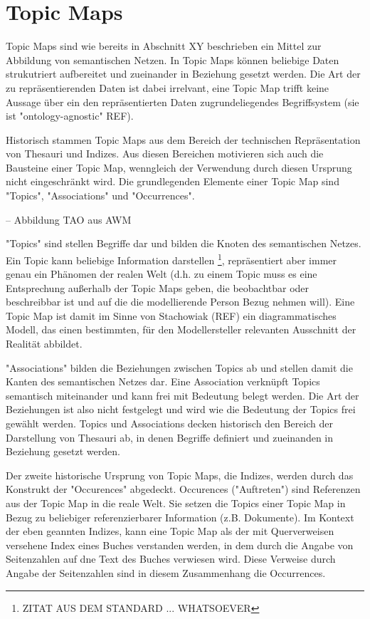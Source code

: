
\section{Topic Maps} %
\label{sec:topic_maps}

Topic Maps sind wie bereits in Abschnitt XY beschrieben ein Mittel zur Abbildung von semantischen Netzen. In Topic Maps können beliebige Daten strukutriert aufbereitet und zueinander in Beziehung gesetzt werden. Die Art der zu repräsentierenden Daten ist dabei irrelvant, eine Topic Map trifft keine Aussage über ein den repräsentierten Daten zugrundeliegendes Begriffsystem (sie ist "ontology-agnostic" REF).

Historisch stammen Topic Maps aus dem Bereich der technischen Repräsentation von Thesauri und Indizes. Aus diesen Bereichen motivieren sich auch die Bausteine einer Topic Map, wenngleich der Verwendung durch diesen Ursprung nicht eingeschränkt wird. Die grundlegenden Elemente einer Topic Map sind "Topics", "Associations" und "Occurrences". 

-- Abbildung TAO aus AWM

 "Topics" sind stellen Begriffe dar und bilden die Knoten des semantischen Netzes. Ein Topic kann beliebige Information darstellen \footnote{ZITAT AUS DEM STANDARD ... WHATSOEVER}, repräsentiert aber immer genau ein Phänomen der realen Welt (d.h. zu einem Topic muss es eine Entsprechung außerhalb der Topic Maps geben, die beobachtbar oder beschreibbar ist und auf die die modellierende Person Bezug nehmen will). Eine Topic Map ist damit im Sinne von Stachowiak (REF) ein diagrammatisches Modell, das einen bestimmten, für den Modellersteller relevanten Ausschnitt der Realität abbildet.

"Associations" bilden die Beziehungen zwischen Topics ab und stellen damit die Kanten des semantischen Netzes dar. Eine Association verknüpft Topics semantisch miteinander und kann frei mit Bedeutung belegt werden. Die Art der Beziehungen ist also nicht festgelegt und wird wie die Bedeutung der Topics frei gewählt werden. Topics und Associations decken historisch den Bereich der Darstellung von Thesauri ab, in denen Begriffe definiert und zueinanden in Beziehung gesetzt werden. 

Der zweite historische Ursprung von Topic Maps, die Indizes, werden durch das Konstrukt der "Occurences" abgedeckt. Occurences ("Auftreten") sind Referenzen aus der Topic Map in die reale Welt. Sie setzen die Topics einer Topic Map in Bezug zu beliebiger referenzierbarer Information (z.B. Dokumente). Im Kontext der eben geannten Indizes, kann eine Topic Map als der mit Querverweisen versehene Index eines Buches verstanden werden, in dem durch die Angabe von Seitenzahlen auf dne Text des Buches verwiesen wird. Diese Verweise durch Angabe der Seitenzahlen sind in diesem Zusammenhang die Occurrences.

